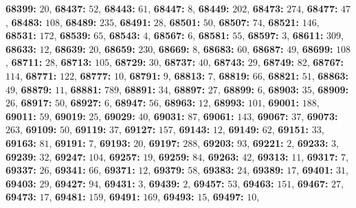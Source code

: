 \textsf{\bfseries 68399:} $20$, \textsf{\bfseries 68437:} $52$, \textsf{\bfseries 68443:} $61$, \textsf{\bfseries 68447:} $8$, \textsf{\bfseries 68449:} $202$, \textsf{\bfseries 68473:} $274$, \textsf{\bfseries 68477:} $47$, \textsf{\bfseries 68483:} $108$, \textsf{\bfseries 68489:} $235$, \textsf{\bfseries 68491:} $28$, \textsf{\bfseries 68501:} $50$, \textsf{\bfseries 68507:} $74$, \textsf{\bfseries 68521:} $146$, \textsf{\bfseries 68531:} $172$, \textsf{\bfseries 68539:} $65$, \textsf{\bfseries 68543:} $4$, \textsf{\bfseries 68567:} $6$, \textsf{\bfseries 68581:} $55$, \textsf{\bfseries 68597:} $3$, \textsf{\bfseries 68611:} $309$, \textsf{\bfseries 68633:} $12$, \textsf{\bfseries 68639:} $20$, \textsf{\bfseries 68659:} $230$, \textsf{\bfseries 68669:} $8$, \textsf{\bfseries 68683:} $60$, \textsf{\bfseries 68687:} $49$, \textsf{\bfseries 68699:} $108$, \textsf{\bfseries 68711:} $28$, \textsf{\bfseries 68713:} $105$, \textsf{\bfseries 68729:} $30$, \textsf{\bfseries 68737:} $40$, \textsf{\bfseries 68743:} $29$, \textsf{\bfseries 68749:} $82$, \textsf{\bfseries 68767:} $114$, \textsf{\bfseries 68771:} $122$, \textsf{\bfseries 68777:} $10$, \textsf{\bfseries 68791:} $9$, \textsf{\bfseries 68813:} $7$, \textsf{\bfseries 68819:} $66$, \textsf{\bfseries 68821:} $51$, \textsf{\bfseries 68863:} $49$, \textsf{\bfseries 68879:} $11$, \textsf{\bfseries 68881:} $789$, \textsf{\bfseries 68891:} $34$, \textsf{\bfseries 68897:} $27$, \textsf{\bfseries 68899:} $6$, \textsf{\bfseries 68903:} $35$, \textsf{\bfseries 68909:} $26$, \textsf{\bfseries 68917:} $50$, \textsf{\bfseries 68927:} $6$, \textsf{\bfseries 68947:} $56$, \textsf{\bfseries 68963:} $12$, \textsf{\bfseries 68993:} $101$, \textsf{\bfseries 69001:} $188$, \textsf{\bfseries 69011:} $59$, \textsf{\bfseries 69019:} $25$, \textsf{\bfseries 69029:} $40$, \textsf{\bfseries 69031:} $87$, \textsf{\bfseries 69061:} $143$, \textsf{\bfseries 69067:} $37$, \textsf{\bfseries 69073:} $263$, \textsf{\bfseries 69109:} $50$, \textsf{\bfseries 69119:} $37$, \textsf{\bfseries 69127:} $157$, \textsf{\bfseries 69143:} $12$, \textsf{\bfseries 69149:} $62$, \textsf{\bfseries 69151:} $33$, \textsf{\bfseries 69163:} $81$, \textsf{\bfseries 69191:} $7$, \textsf{\bfseries 69193:} $20$, \textsf{\bfseries 69197:} $288$, \textsf{\bfseries 69203:} $93$, \textsf{\bfseries 69221:} $2$, \textsf{\bfseries 69233:} $3$, \textsf{\bfseries 69239:} $32$, \textsf{\bfseries 69247:} $104$, \textsf{\bfseries 69257:} $19$, \textsf{\bfseries 69259:} $84$, \textsf{\bfseries 69263:} $42$, \textsf{\bfseries 69313:} $11$, \textsf{\bfseries 69317:} $7$, \textsf{\bfseries 69337:} $26$, \textsf{\bfseries 69341:} $66$, \textsf{\bfseries 69371:} $12$, \textsf{\bfseries 69379:} $58$, \textsf{\bfseries 69383:} $24$, \textsf{\bfseries 69389:} $17$, \textsf{\bfseries 69401:} $31$, \textsf{\bfseries 69403:} $29$, \textsf{\bfseries 69427:} $94$, \textsf{\bfseries 69431:} $3$, \textsf{\bfseries 69439:} $2$, \textsf{\bfseries 69457:} $53$, \textsf{\bfseries 69463:} $151$, \textsf{\bfseries 69467:} $27$, \textsf{\bfseries 69473:} $17$, \textsf{\bfseries 69481:} $159$, \textsf{\bfseries 69491:} $169$, \textsf{\bfseries 69493:} $15$, \textsf{\bfseries 69497:} $10$, 
